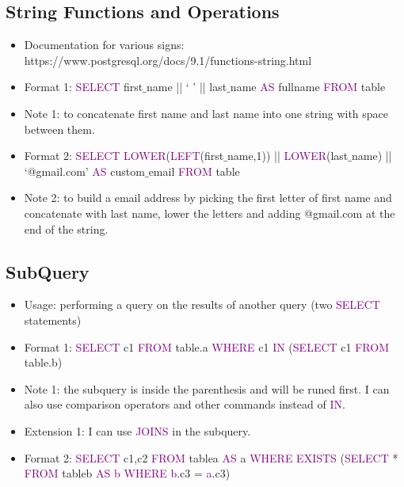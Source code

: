 \documentclass[a4paper]{article}
\begin{document}
\subsection{String Functions and Operations}
\begin{itemize}
  \item Documentation for various signs: https://www.postgresql.org/docs/9.1/functions-string.html
  \item Format 1: \textcolor{purple}{SELECT} first$\_$name || ` ' || last$\_$name \textcolor{purple}{AS} fullname  \textcolor{purple}{FROM} table 
  \item Note 1: to concatenate first name and last name into one string with space between them.
  \item Format 2: \textcolor{purple}{SELECT} \textcolor{purple}{LOWER}(\textcolor{purple}{LEFT}(first$\_$name,1)) || \textcolor{purple}{LOWER}(last$\_$name) || `@gmail.com' \textcolor{purple}{AS} custom$\_$email  \textcolor{purple}{FROM} table 
  \item Note 2: to build a email address by picking the first letter of first name and concatenate with last name, lower the letters and adding @gmail.com at the end of the string.
\end{itemize}

\subsection{SubQuery}
\begin{itemize}
  \item Usage: performing a query on the results of another query (two \textcolor{purple}{SELECT} statements)
  \item Format 1: \textcolor{purple}{SELECT} c1 \textcolor{purple}{FROM} table.a \textcolor{purple}{WHERE} c1 \textcolor{purple}{IN} (\textcolor{purple}{SELECT} c1 \textcolor{purple}{FROM} table.b)
  \item Note 1: the subquery is inside the parenthesis and will be runed first. I can also use comparison operators and other commands instead of \textcolor{purple}{IN}.
  \item Extension 1: I can use \textcolor{purple}{JOINS} in the subquery.
  \item Format 2: \textcolor{purple}{SELECT} c1,c2 \textcolor{purple}{FROM} tablea \textcolor{purple}{AS} a \textcolor{purple}{WHERE} \textcolor{purple}{EXISTS} (\textcolor{purple}{SELECT} * \textcolor{purple}{FROM} tableb \textcolor{purple}{AS}  \textcolor{purple}{b} \textcolor{purple}{WHERE} \textcolor{purple}{b}.c3 = \textcolor{purple}{a}.c3) 
\end{itemize}
\end{document}

